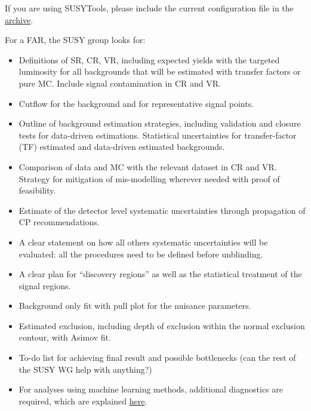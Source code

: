 If you are using SUSYTools, please include the current configuration file in the \href{http://gitlab.cern.ch/atlas-phys-susy-wg/AnalysisSUSYToolsConfigurations}{archive}.

For a FAR, the SUSY group looks for:
\begin{itemize}
\item Definitions of SR, CR, VR, including expected yields with the targeted luminosity for all backgrounds that will be estimated with transfer factors or pure MC. Include signal contamination in CR and VR.
\item Cutflow for the background and for representative signal points.
\item Outline of background estimation strategies, including validation and closure tests for data-driven estimations. Statistical uncertainties for transfer-factor (TF) estimated and data-driven estimated backgrounds.
\item Comparison of data and MC with the relevant dataset in CR and VR. Strategy for mitigation of mis-modelling wherever needed with proof of feasibility.
\item Estimate of the detector level systematic uncertainties through propagation of CP recommendations.
\item A clear statement on how all others systematic uncertainties will be evaluated: all the procedures need to be defined before unblinding.
\item A clear plan for ``discovery regions'' as well as the statistical treatment of the signal regions.
\item Background only fit with pull plot for the nuisance parameters.
\item Estimated exclusion, including depth of exclusion within the normal exclusion contour, with Asimov fit.
\item To-do list for achieving final result and possible bottlenecks (can the rest of the SUSY WG help with anything?)
\item For analyses using machine learning methods, additional diagnostics are required, which are explained \href{https://twiki.cern.ch/twiki/bin/view/AtlasProtected/SusyMachineLearning}{here}.
\end{itemize}

